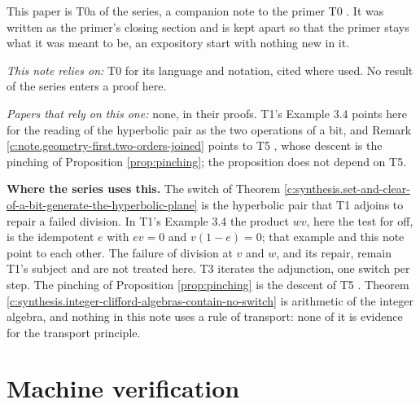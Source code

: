 \documentclass[11pt]{article}
\theoremstyle{definition}
\theoremstyle{plain}
\begin{document}
\label{c:note.geometry-first.setting-position-series}
This paper is T0a of the series, a companion note to the primer T0 \cite{ButlerT0}. It was written as the primer's closing section and is kept apart so that the primer stays what it was meant to be, an expository start with nothing new in it.

\emph{This note relies on:} T0 \cite{ButlerT0} for its language and notation, cited where used. No result of the series enters a proof here.

\emph{Papers that rely on this one:} none, in their proofs. T1's Example 3.4 \cite{ButlerT1} points here for the reading of the hyperbolic pair as the two operations of a bit, and Remark \ref{c:note.geometry-first.two-orders-joined} points to T5 \cite{ButlerT5}, whose descent is the pinching of Proposition \ref{prop:pinching}; the proposition does not depend on T5.

\label{c:note.geometry-first.setting-position-series-2}
\textbf{Where the series uses this.} The switch of Theorem \ref{c:synthesis.set-and-clear-of-a-bit-generate-the-hyperbolic-plane} is the hyperbolic pair that T1 \cite{ButlerT1} adjoins to repair a failed division. In T1's Example 3.4 the product $wv$, here the test for off, is the idempotent $e$ with $ev = 0$ and $v(1 - e) = 0$; that example and this note point to each other. The failure of division at $v$ and $w$, and its repair, remain T1's subject and are not treated here. T3 \cite{ButlerT3} iterates the adjunction, one switch per step. The pinching of Proposition \ref{prop:pinching} is the descent of T5 \cite{ButlerT5}. Theorem \ref{c:synthesis.integer-clifford-algebras-contain-no-switch} is arithmetic of the integer algebra, and nothing in this note uses a rule of transport: none of it is evidence for the transport principle.

\section{Machine verification}
\end{document}
